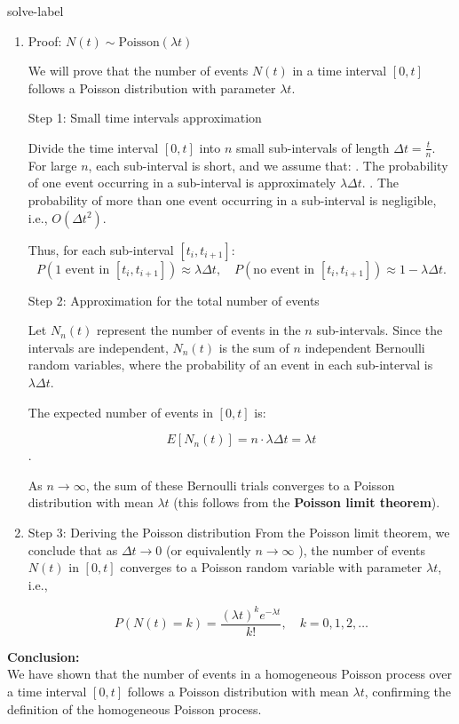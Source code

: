 \begin{solve}{}{solve-label}
\begin{enumerate}
			\item Proof: $N(t) \sim \text{Poisson}(\lambda t)$
			
			We will prove that the number of events $N(t)$ in a time interval $[0, t]$ follows a Poisson distribution with parameter $\lambda t$.
			
			\subitem Step 1: Small time intervals approximation
			
			Divide the time interval $[0, t]$ into $n$ small sub-intervals of length  $\Delta t = \frac{t}{n}$. For large $n$, each sub-interval is short, and we assume that:
			. The probability of one event occurring in a sub-interval is approximately $\lambda \Delta t$.
			. The probability of more than one event occurring in a sub-interval is negligible, i.e., $O(\Delta t^2)$.
			
			Thus, for each sub-interval $[t_i, t_{i+1}]$:
			$$P(\text{1 event in } [t_i, t_{i+1}]) \approx \lambda \Delta t, \quad P(\text{no event in } [t_i, t_{i+1}]) \approx 1 - \lambda \Delta t.$$
			
			\subitem Step 2: Approximation for the total number of events
			
			Let $N_n(t)$ represent the number of events in the $n$ sub-intervals. Since the intervals are independent, $N_n(t)$ is the sum of $n$ independent Bernoulli random variables, where the probability of an event in each sub-interval is $\lambda \Delta t$.
			
			The expected number of events in $[0, t]$ is:
			
			$$E[N_n(t)] = n \cdot \lambda \Delta t = \lambda t$$.
			
			
			As $n \to \infty$, the sum of these Bernoulli trials converges to a Poisson distribution with mean $\lambda t$ (this follows from the \textbf{Poisson limit theorem}).
			
			\item Step 3: Deriving the Poisson distribution
			From the Poisson limit theorem, we conclude that as $\Delta t \to 0$  (or equivalently $n \to \infty$ ), the number of events $N(t)$ in $[0, t]$ converges to a Poisson random variable with parameter $\lambda t$, i.e.,
			
			$$P(N(t) = k) = \frac{(\lambda t)^k e^{-\lambda t}}{k!}, \quad k = 0, 1, 2, \dots$$
			
		\end{enumerate}
		\textbf{Conclusion:}\\
		We have shown that the number of events in a homogeneous Poisson process over a time interval $[0, t]$ follows a Poisson distribution with mean $\lambda t$, confirming the definition of the homogeneous Poisson process.
	\end{solve}
	
	
	
	
	
	
